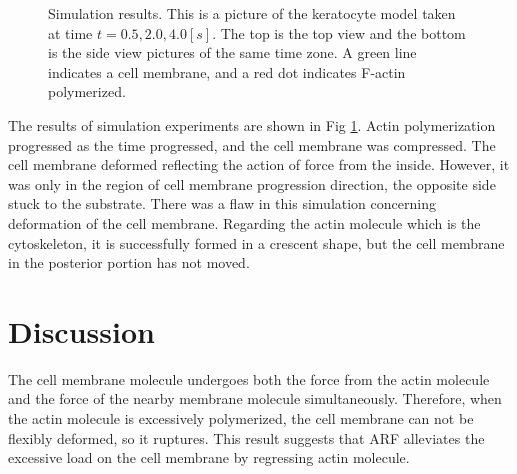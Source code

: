 \documentclass[a4paper,12pt]{book}
\begin{document}
\begin{figure}[h]
{\begin{tabular}{c}
  \end{tabular}
 }%
 \caption{Simulation results. This is a picture of the keratocyte model taken at time $t = 0.5, 2.0, 4.0 [s]$. The top is the top view and the bottom is the side view pictures of the same time zone. A green line indicates a cell membrane, and a red dot indicates F-actin polymerized.}
 \label{fig:res0}
\end{figure}
The results of simulation experiments are shown in Fig \ref{fig:res0}. Actin polymerization progressed as the time progressed, and the cell membrane was compressed. The cell membrane deformed reflecting the action of force from the inside. However, it was only in the region of cell membrane progression direction, the opposite side stuck to the substrate. There was a flaw in this simulation concerning deformation of the cell membrane. Regarding the actin molecule which is the cytoskeleton, it is successfully formed in a crescent shape, but the cell membrane in the posterior portion has not moved.

\section{Discussion}
The cell membrane molecule undergoes both the force from the actin molecule and the force of the nearby membrane molecule simultaneously. Therefore, when the actin molecule is excessively polymerized, the cell membrane can not be flexibly deformed, so it ruptures. This result suggests that ARF alleviates the excessive load on the cell membrane by regressing actin molecule.
\end{document}
